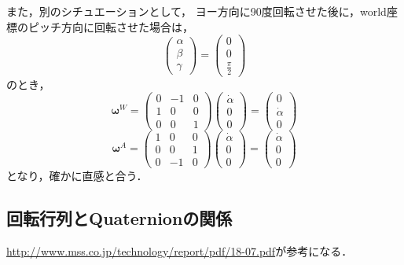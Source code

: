また，別のシチュエーションとして，
ヨー方向に90度回転させた後に，world座標のピッチ方向に回転させた場合は，
\begin{equation}
  \begin{pmatrix}
    \alpha \\
    \beta \\
    \gamma
  \end{pmatrix} =
  \begin{pmatrix}
    0 \\
    0 \\
    \frac{\pi}{2}
  \end{pmatrix}
\end{equation}
のとき，
\begin{equation}
  \boldsymbol{\omega}^{W} =
  \begin{pmatrix}
    0 & -1 & 0\\
    1 & 0 & 0\\
    0 & 0 & 1
  \end{pmatrix}
  \begin{pmatrix}
    \dot{\alpha} \\
    0 \\
    0
  \end{pmatrix} =
  \begin{pmatrix}
    0 \\
    \dot{\alpha} \\
    0
  \end{pmatrix}
\end{equation}
\begin{equation}
  \boldsymbol{\omega}^{A} =
  \begin{pmatrix}
    1 & 0 & 0\\
    0 & 0 & 1\\
    0 & -1 & 0
  \end{pmatrix}
  \begin{pmatrix}
    \dot{\alpha} \\
    0 \\
    0
  \end{pmatrix} =
  \begin{pmatrix}
    \dot{\alpha} \\
    0 \\
    0
  \end{pmatrix}
\end{equation}
となり，確かに直感と合う．

\subsection{回転行列とQuaternionの関係}\label{subsec:quat}
\url{http://www.mss.co.jp/technology/report/pdf/18-07.pdf}が参考になる．

